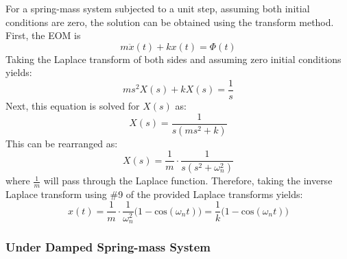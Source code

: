 \documentclass[12pt,letter]{article}
\begin{document}
For a spring-mass system subjected to a unit step, assuming both initial conditions are zero, the solution can be obtained using the transform method. First, the EOM is 
\begin{equation}
m\ddot{x}(t) + kx(t) = \Phi(t)
\end{equation}
Taking the Laplace transform of both sides and assuming zero initial conditions yields:
\begin{equation}
	ms^2X(s)+kX(s) =\frac{1}{s}
\end{equation}
Next, this equation is solved for $X(s)$ as:
\begin{equation}
	X(s) = \frac{1}{s(ms^2+k)}
\end{equation}
This can be rearranged as:
\begin{equation}
	X(s) = \frac{1}{m} \cdot \frac{1}{s(s^2+\omega_n^2)}
\end{equation}
where $\frac{1}{m}$ will pass through the Laplace function. Therefore, taking the inverse Laplace transform using \#9 of the provided Laplace transforms yields:
\begin{equation}
	x(t) = \frac{1}{m} \cdot \frac{1}{\omega_n^2}\big(1-\text{cos}(\omega_n t)\big) = \frac{1}{k}\big(1-\text{cos}(\omega_n t)\big)
\end{equation}
 
\subsubsection{Under Damped Spring-mass System}
\end{document}

